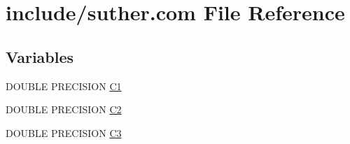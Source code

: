 \hypertarget{home_2abonfi_2_c_f_d__codes_2_eul_f_s_83_84_2include_2suther_8com}{\section{include/suther.com File Reference}
\label{home_2abonfi_2_c_f_d__codes_2_eul_f_s_83_84_2include_2suther_8com}
}
\subsection*{Variables}
\begin{DoxyCompactItemize}
\item 
D\-O\-U\-B\-L\-E P\-R\-E\-C\-I\-S\-I\-O\-N \hyperlink{home_2abonfi_2_c_f_d__codes_2_eul_f_s_83_84_2include_2suther_8com_ab5cd2bb7fe9bc6f4c3fbce5047b24fdd}{C1}
\item 
D\-O\-U\-B\-L\-E P\-R\-E\-C\-I\-S\-I\-O\-N \hyperlink{home_2abonfi_2_c_f_d__codes_2_eul_f_s_83_84_2include_2suther_8com_a3331bf2c79fcd00308bcc7b0cef16dbc}{C2}
\item 
D\-O\-U\-B\-L\-E P\-R\-E\-C\-I\-S\-I\-O\-N \hyperlink{home_2abonfi_2_c_f_d__codes_2_eul_f_s_83_84_2include_2suther_8com_aef24340798c9166836ba767a9170bf1a}{C3}
\end{DoxyCompactItemize}


